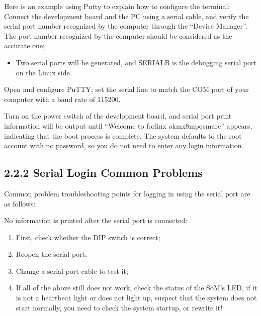 \documentclass[letterpaper,10pt,openany,english]{sphinxmanual}
\begin{document}
\sphinxAtStartPar
Here is an example using Putty to explain how to configure the terminal:\\
 Connect the development board and the PC using a serial cable, and verify the serial port number recognized by the computer through the “Device Manager”. The port number recognized by the computer should be considered as the accurate one;\\
\begin{itemize}
\item {} 
\sphinxAtStartPar
Two serial ports will be generated, and SERIAL\sphinxhyphen{}B is the debugging serial port on the Linux side.

\end{itemize}

\sphinxAtStartPar
{} Open and configure PuTTY; set the serial line to match the COM port of your computer with a baud rate of 115200.\\

\sphinxAtStartPar
{} Turn on the power switch of the development board, and serial port print information will be output until “Welcome to forlinx ok\sphinxhyphen{}mx8mpq\sphinxhyphen{}smarc” appears, indicating that the boot process is complete. The system defaults to the root account with no password, so you do not need to enter any login information.


\subsection{2.2.2 Serial Login Common Problems}
\label{\detokenize{linux-manual:serial-login-common-problems}}
\sphinxAtStartPar
Common problem troubleshooting points for logging in using the serial port are as follows:

\sphinxAtStartPar
{} No information is printed after the serial port is connected:
\begin{enumerate}
%
\item {} 
\sphinxAtStartPar
First, check whether the DIP switch is correct;

\item {} 
\sphinxAtStartPar
Re\sphinxhyphen{}open the serial port;

\item {} 
\sphinxAtStartPar
Change a serial port cable to test it;

\item {} 
\sphinxAtStartPar
If all of the above still does not work, check the status of the SoM’s LED, if it is not a heartbeat light or does not light up, suspect that the system does not start normally, you need to check the system startup, or rewrite it!

\end{enumerate}
\end{document}
